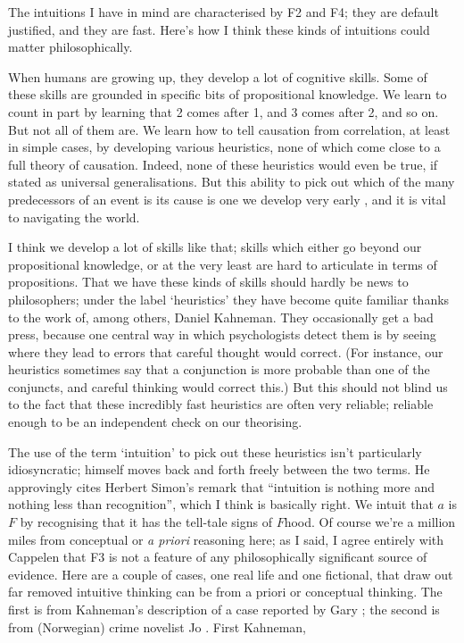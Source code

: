 The intuitions I have in mind are characterised by F2 and F4; they are default justified, and they are fast. Here's how I think these kinds of intuitions could matter philosophically.

When humans are growing up, they develop a lot of cognitive skills. Some of these skills are grounded in specific bits of propositional knowledge. We learn to count in part by learning that 2 comes after 1, and 3 comes after 2, and so on. But not all of them are. We learn how to tell causation from correlation, at least in simple cases, by developing various heuristics, none of which come close to a full theory of causation. Indeed, none of these heuristics would even be true, if stated as universal generalisations. But this ability to pick out which of the many predecessors of an event is its cause is one we develop very early \citep[33-44]{Gopnik2009}, and it is vital to navigating the world. 

I think we develop a lot of skills like that; skills which either go beyond our propositional knowledge, or at the very least are hard to articulate in terms of propositions. %
That we have these kinds of skills should hardly be news to philosophers; under the label `heuristics' they have become quite familiar thanks to the work of, among others, Daniel Kahneman. They occasionally get a bad press, because one central way in which psychologists detect them is by seeing where they lead to errors that careful thought would correct. (For instance, our heuristics sometimes say that a conjunction is more probable than one of the conjuncts, and careful thinking would correct this.) But this should not blind us to the fact that these incredibly fast heuristics are often very reliable; reliable enough to be an independent check on our theorising.

The use of the term `intuition' to pick out these heuristics isn't particularly idiosyncratic; \citet{Kahneman2011} himself moves back and forth freely between the two terms. He approvingly cites Herbert Simon's remark that ``intuition is nothing more and nothing less than recognition'', which I think is basically right. We intuit that $a$ is $F$ by recognising that it has the tell-tale signs of $F$hood. Of course we're a million miles from conceptual or \textit{a priori} reasoning here; as I said, I agree entirely with Cappelen that F3 is not a feature of any philosophically significant source of evidence. Here are a couple of cases, one real life and one fictional, that draw out far removed intuitive thinking can be from a priori or conceptual thinking. The first is from Kahneman's description of a case reported by Gary \citet{Klein1999}; the second is from (Norwegian) crime novelist Jo \citet{Nesbo2009}. First Kahneman,

